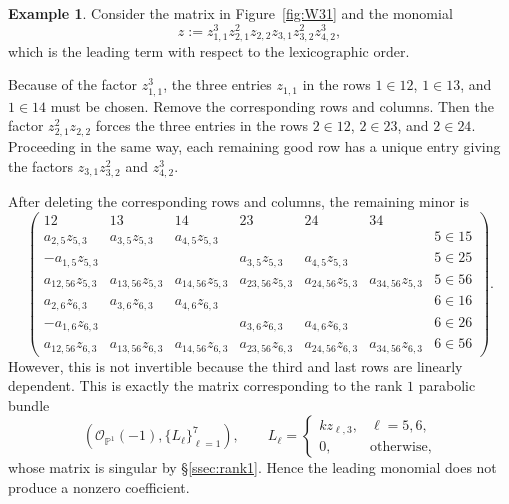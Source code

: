 \documentclass[12pt, letterpaper]{amsart}
\theoremstyle{definition}
\newtheorem{example}[theorem]{Example}
\newcommand{\PP}{\mathbb{P} }
\newcommand{\cO}{\mathcal{O} }
\begin{document}
\begin{example}\label{ex:rk3_forcing}
Consider the matrix in Figure~\ref{fig:W31} and the monomial
\[z := z_{1,1}^3 z_{2,1}^2 z_{2,2} z_{3,1} z_{3,2}^2 z_{4,2}^3,\]
which is the leading term with respect to the lexicographic order.

Because of the factor \(z_{1,1}^3\), the three entries \(z_{1,1}\) in the rows \(1\in12\), \(1\in13\), and \(1\in14\) must be chosen. Remove the corresponding rows and columns. Then the factor \(z_{2,1}^2z_{2,2}\) forces the three entries in the rows \(2\in12\), \(2\in23\), and \(2\in24\). Proceeding in the same way, each remaining good row has a unique entry giving the factors \(z_{3,1}z_{3,2}^2\) and \(z_{4,2}^3\).

After deleting the corresponding rows and columns, the remaining minor is
\[
\left( \begin{array}{cccccc|c}
  12 & 13 & 14 & 23 & 24 & 34 & \\
  \hline a_{2,5}z_{5,3} & a_{3,5}z_{5,3} & a_{4,5}z_{5,3} &&&& 5\in 15\\
  -a_{1,5}z_{5,3} &&& a_{3,5}z_{5,3} & a_{4,5}z_{5,3} && 5\in 25\\
  a_{12,56}z_{5,3} & a_{13,56}z_{5,3} & a_{14,56}z_{5,3} & a_{23,56}z_{5,3} & a_{24,56}z_{5,3} & a_{34,56}z_{5,3} & 5\in 56\\
  a_{2,6}z_{6,3} & a_{3,6}z_{6,3} & a_{4,6}z_{6,3} &&&& 6\in 16\\
  -a_{1,6}z_{6,3} &&& a_{3,6}z_{6,3} & a_{4,6}z_{6,3} && 6\in 26\\
  a_{12,56}z_{6,3} & a_{13,56}z_{6,3} & a_{14,56}z_{6,3} & a_{23,56}z_{6,3} & a_{24,56}z_{6,3} & a_{34,56}z_{6,3} & 6\in 56
\end{array} \right).
\]
However, this is not invertible because the third and last rows are linearly dependent. This is exactly the matrix corresponding to the rank \(1\) parabolic bundle
\[\left(\cO_{\PP^1}(-1),\{L_\ell\}_{\ell=1}^7\right),\qquad L_\ell= \begin{cases} kz_{\ell,3}, & \ell=5,6,\\ 0, & \text{otherwise,} \end{cases}\]
whose matrix is singular by \S\ref{ssec:rank1}. Hence the leading monomial does not produce a nonzero coefficient.
\end{example}
\end{document}
